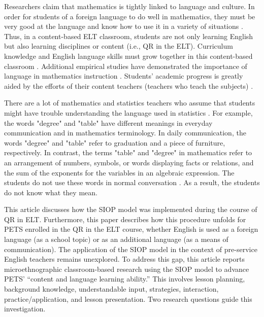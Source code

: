 \documentclass[english]{textolivre}
\begin{document}
Researchers \cite{goldenberg_teaching_2008,moschkovich_using_2006,fatmawati_fractional_2019,farchan_analisis_2020,windarto_mathematical_2021} claim that mathematics is tightly linked to language and culture. In order for students of a foreign language to do well in mathematics, they must be very good at the language and know how to use it in a variety of situations \cite{kotsopoulos_mathematics_2007,morgan_language_2014,nacarato_role_2014,chen_research_2008}. Thus, in a content-based ELT classroom, students are not only learning English but also learning disciplines or content (i.e., QR in the ELT). Curriculum knowledge and English language skills must grow together in this content-based classroom \cite{gibbons_mediating_2003}. Additional empirical studies have demonstrated the importance of language in mathematics instruction \cite{barwell_heteroglossia_2012,goldenberg_teaching_2008}. Students' academic progress is greatly aided by the efforts of their content teachers (teachers who teach the subjects) \cite{gersten_lost_1999,reeves_secondary_2006}.

There are a lot of mathematics and statistics teachers who assume that students might have trouble understanding the language used in statistics \cite{bay-williams_is_2007,borgioli_equity_2008}. For example, the words "degree" and "table" have different meanings in everyday communication and in mathematics terminology. In daily communication, the words "degree" and "table" refer to graduation and a piece of furniture, respectively. In contrast, the terms "table" and "degree" in mathematics refer to an arrangement of numbers, symbols, or words displaying facts or relations, and the sum of the exponents for the variables in an algebraic expression. The students do not use these words in normal conversation \cite{kaplan_lexical_2009,lesser_english_2009,rubenstein_understanding_2002,watson_statistical_2006,winsor_bridging_2007}. As a result, the students do not know what they mean.

This article discusses how the SIOP model was implemented during the course of QR in ELT. Furthermore, this paper describes how this procedure unfolds for PETS enrolled in the QR in the ELT course, whether English is used as a foreign language (as a school topic) or as an additional language (as a means of communication). The application of the SIOP model in the context of pre-service English teachers remains unexplored. To address this gap, this article reports microethnographic classroom-based research using the SIOP model to advance PETS’ “content and language learning ability.” This involves lesson planning, background knowledge, understandable input, strategies, interaction, practice/application, and lesson presentation. Two research questions guide this investigation.
\end{document}
